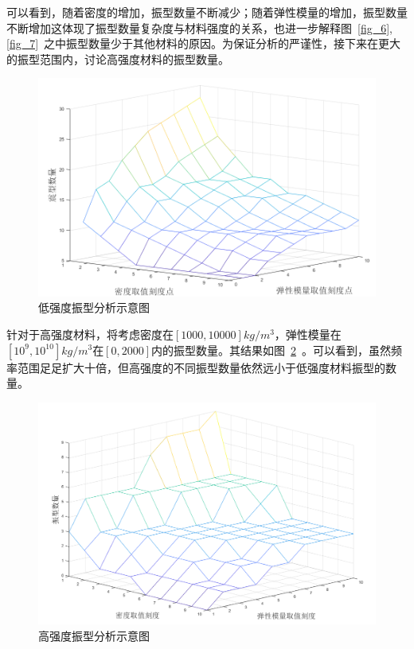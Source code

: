 \documentclass[withoutpreface,bwprint]{cumcmthesis} %
\begin{document}
可以看到，随着密度的增加，振型数量不断减少；随着弹性模量的增加，振型数量不断增加这体现了振型数量复杂度与材料强度的关系，也进一步解释图~\ref{fig_6},\ref{fig_7}~之中振型数量少于其他材料的原因。为保证分析的严谨性，接下来在更大的振型范围内，讨论高强度材料的振型数量。
\begin{figure}[H]
\centering %
\includegraphics[width=0.6\linewidth]{CUMCMThesis-master/figures/Low.png}\caption{低强度振型分析示意图}
\label{Low}
\end{figure}

针对于高强度材料，将考虑密度在$\left[1000,10000\right]kg/m^3$，弹性模量在$\left[10^9,10^10\right]kg/m^3$在$\left[0,2000\right]$内的振型数量。其结果如图~\ref{High}~。可以看到，虽然频率范围足足扩大十倍，但高强度的不同振型数量依然远小于低强度材料振型的数量。
\begin{figure}[H]
\centering %
\includegraphics[width=0.6\linewidth]{CUMCMThesis-master/figures/High.png}\caption{高强度振型分析示意图}
\label{High}
\end{figure}
\end{document}
